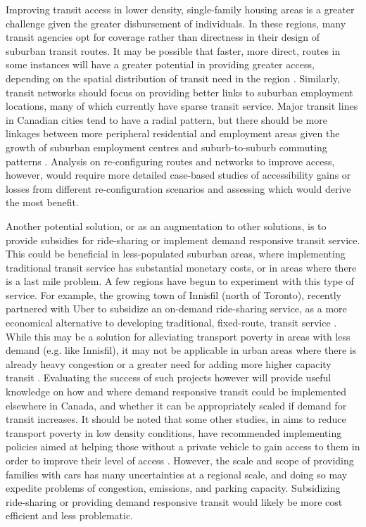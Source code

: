 \documentclass[11 pt, letterpaper]{article}
\begin{document}
{Improving transit access in lower density, single-family housing areas is a greater challenge given the greater disbursement of individuals. In these regions, many transit agencies opt for coverage rather than directness in their design of suburban transit routes. It may be possible that faster, more direct, routes in some instances will have a greater potential in providing greater access, depending on the spatial distribution of transit need in the region \cite{walker2012}. Similarly, transit networks should focus on providing better links to suburban employment locations, many of which currently have sparse transit service. Major transit lines in Canadian cities tend to have a radial pattern, but there should be more linkages between more peripheral residential and employment areas given the growth of suburban employment centres and suburb-to-suburb commuting patterns \cite{blais2015}. Analysis on re-configuring routes and networks to improve access, however, would require more detailed case-based studies of accessibility gains or losses from different re-configuration scenarios and assessing which would derive the most benefit.

Another potential solution, or as an augmentation to other solutions, is to provide subsidies for ride-sharing or implement demand responsive transit service. This could be beneficial in less-populated suburban areas, where implementing traditional transit service has substantial monetary costs, or in areas where there is a last mile problem. A few regions have begun to experiment with this type of service. For example, the growing town of Innisfil (north of Toronto), recently partnered with Uber to subsidize an on-demand ride-sharing service, as a more economical alternative to developing traditional, fixed-route, transit service \cite{innisfil2017}. While this may be a solution for alleviating transport poverty in areas with less demand (e.g. like Innisfil), it may not be applicable in urban areas where there is already heavy congestion or a greater need for adding more higher capacity transit \cite{mageean2003}. Evaluating the success of such projects however will provide useful knowledge on how and where demand responsive transit could be implemented elsewhere in Canada, and whether it can be appropriately scaled if demand for transit increases.
It should be noted that some other studies, in aims to reduce transport poverty in low density conditions, have recommended implementing policies aimed at helping those without a private vehicle to gain access to them in order to improve their level of access . However, the scale and scope of providing families with cars has many uncertainties at a regional scale, and doing so may expedite problems of congestion, emissions, and parking capacity. Subsidizing ride-sharing or providing demand responsive transit would likely be more cost efficient and less problematic.

}
\end{document}
